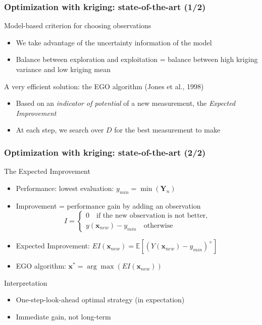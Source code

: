 \documentclass[10pt]{beamer}
\begin{document}
\frame
{
\frametitle{Optimization with kriging: state-of-the-art (1/2)}

\begin{block}{Model-based criterion for choosing observations}
\begin{itemize}
	\item We take advantage of the uncertainty information of the model
	\item Balance between exploration and exploitation = balance between high kriging variance and low kriging mean
\end{itemize}
\end{block}

\begin{block}{A very efficient solution: the EGO algorithm (Jones et al., 1998)}
\begin{itemize}
	\item Based on an \textit{indicator of potential} of a new measurement, the \textit{Expected Improvement}
	\item At each step, we search over $D$ for the best measurement to make
\end{itemize}
\end{block}
}
\frame
{
\frametitle{Optimization with kriging: state-of-the-art (2/2)}
\begin{block}{The Expected Improvement}
\begin{itemize}
	\item Performance: lowest evaluation: $y_{min} = \min(\mathbf{Y}_n)$
	\item Improvement = performance gain by adding an observation
	$$I = \left\{
	\begin{array}{l}
	 0  \quad \text{if the new observation is not better,}\\
	 y(\mathbf{x}_{new}) - y_{min} \quad \text{otherwise}
	\end{array} \right.$$
	\item Expected Improvement: $EI(\mathbf{x}_{new}) = \mathbb{E}\left[ \left( Y(\mathbf{x}_{new}) - y_{min}  \right) ^+\right]$
	\item EGO algorithm: $\mathbf{x}^* = \arg \max(EI(\mathbf{x}_{new}))$
\end{itemize}
\end{block}

\begin{block}{Interpretation}
\begin{itemize}
	\item One-step-look-ahead optimal strategy (in expectation)
	\item Immediate gain, not long-term
\end{itemize}
\end{block}
}
\end{document}
